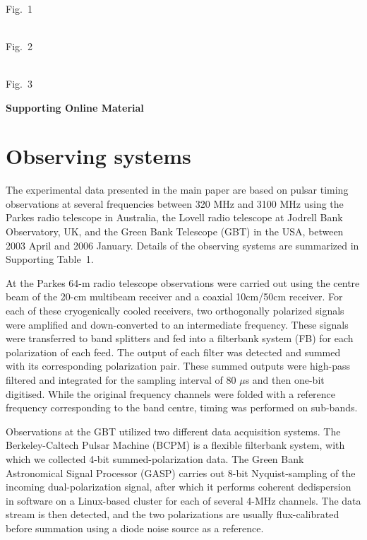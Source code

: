 \documentclass[12pt,psfig]{article}
\begin{document}
\newpage

\centerline{\\ Fig.~1}

\newpage
\centerline{\\ Fig.~2}

\newpage
\centerline{\\Fig.~3}

\newpage

\centerline{\large \bf Supporting Online Material}


\section{Observing systems}

The experimental data presented in the main paper are based on pulsar
timing observations at several frequencies between 320 MHz and 3100
MHz using the Parkes radio telescope in Australia, the Lovell
radio telescope at Jodrell Bank Observatory, UK, and the Green Bank
Telescope (GBT) in the USA, between 2003 April and 2006
January. Details of the observing systems are summarized in
Supporting Table~1.

At the Parkes 64-m radio telescope observations were carried out using the
centre beam of the 20-cm multibeam receiver and a coaxial 10cm/50cm receiver.
For each of these cryogenically cooled receivers, two orthogonally polarized
signals were amplified and down-converted to an intermediate frequency. These
signals were transferred to band splitters and fed into a filterbank system
(FB) for each polarization of each feed. The output of each filter was
detected and summed with its corresponding polarization pair. These summed
outputs were high-pass filtered and integrated for the sampling interval of 80
$\mu$s and then one-bit digitised.  While the original frequency channels were
folded with a reference frequency corresponding to the band centre, timing was
performed on sub-bands.

Observations at the GBT utilized two different data acquisition systems.  The
Berkeley-Caltech Pulsar Machine (BCPM) is a flexible filterbank
system\cite{bdz+97}, with which we collected 4-bit summed-polarization data.
The Green Bank Astronomical Signal Processor (GASP) carries out 8-bit
Nyquist-sampling of the incoming dual-polarization signal, after which it
performs coherent dedispersion in software on a Linux-based cluster for each
of several 4-MHz channels\cite{drb+04a,fsb+04}. The data stream is then
detected, and the two polarizations are usually flux-calibrated before
summation using a diode noise source as a reference.
\end{document}
